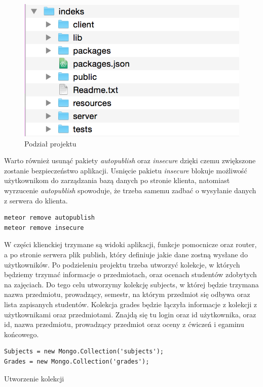 \documentclass{xmgr}
\begin{document}
\begin{figure}[H]
\centering
\includegraphics[width=0.75\hsize]{images/splitProject} 
\caption{Podział projektu\label{RYS.17}}
\end{figure}

Warto również usunąć pakiety \textit{autopublish} oraz \textit{insecure} dzięki czemu zwiększone zostanie bezpieczeństwo aplikacji. Usnięcie pakietu \textit{insecure} blokuje możliwość użytkownikom do zarządzania bazą danych po stronie klienta, natomiast wyrzucenie \textit{autopublish} spowoduje, że trzeba samemu zadbać o wysyłanie danych z serwera do klienta.\cite{DiscoverMeteor2013}

\begin{lstlisting}[language=bash,caption={Usuwanie pakietów}]
meteor remove autopublish
meteor remove insecure
\end{lstlisting}

W części klienckiej trzymane są widoki aplikacji, funkcje pomocnicze oraz router, a po stronie serwera plik publish, który definiuje jakie dane zostną wysłane do użytkowników. Po podzieleniu projektu trzeba utworzyć kolekcje, w których będziemy trzymać informacje o przedmiotach, oraz ocenach studentów zdobytych na zajęciach. Do tego celu utworzymy kolekcję subjects, w której będzie trzymana nazwa przedmiotu, prowadzący, semestr, na którym przedmiot się odbywa oraz lista zapisanych studentów. Kolekcja grades będzie łączyła informacje z kolekcji z użytkownikami oraz przedmiotami. Znajdą się tu login oraz id użytkownika, oraz id, nazwa przedmiotu, prowadzący przedmiot oraz oceny z ćwiczeń i egaminu końcowego.

\begin{listing}[H]
\begin{verbatim}
Subjects = new Mongo.Collection('subjects');
Grades = new Mongo.Collection('grades');
\end{verbatim}
\caption{Utworzenie kolekcji}
\end{listing}
\end{document}
